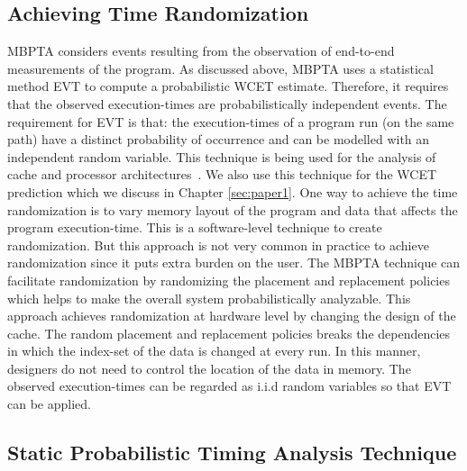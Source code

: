 \subsection{Achieving Time Randomization}
\label{ATR}

MBPTA considers events resulting from the observation of end-to-end measurements of the program. As discussed above, MBPTA uses a statistical method EVT to compute a probabilistic WCET estimate. Therefore, it requires that the observed execution-times are probabilistically independent events. The requirement for EVT is that: the execution-times of a program run (on the same path) have a distinct probability of occurrence and can be modelled with an independent random variable. This technique is being used for the analysis of cache and processor architectures~\cite{kosmidis2014measurement, mezzetti2015randomized}. We also use this technique for the WCET prediction which we discuss in Chapter \ref{sec:paper1}.  One way to achieve the time randomization is to vary memory layout of the program and data that affects the program execution-time. This is a software-level technique to create randomization.  But this approach is not very common in  practice to achieve randomization since it puts extra burden on the user. The MBPTA technique can facilitate randomization by randomizing the placement and replacement policies which helps to make the overall system probabilistically analyzable. This approach achieves randomization at hardware level by changing the design of the cache. The random placement and replacement policies breaks the dependencies in which the index-set of the data is changed at every run. In this manner, designers do not need to control the location of the data in memory. The observed execution-times can be regarded as i.i.d random variables so that EVT can be applied.

\subsection{Static Probabilistic Timing Analysis Technique}
\label{static}

